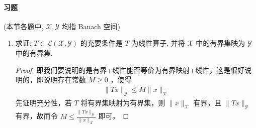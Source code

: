 \paragraph{习题} (本节各题中, $\mathscr{X}, \mathscr{Y}$ 均指 Banach 空间)
\begin{enumerate}[leftmargin=2cm, label=\arabic*]
    \item 求证: $T \in \mathscr{L}(\mathscr{X}, \mathscr{Y})$ 的充要条件是 $T$ 为线性算子, 并将 $\mathscr{X}$ 中的有界集映为 $\mathscr{Y}$ 中的有界集.
\begin{proof}
    即我们要说明的是有界+线性能否等价为有界映射+线性，这是很好说明的，即说明存在常数 $M\geqslant 0$ ，使得
\begin{align*}
    \|Tx\|_{\mathscr{Y}}\leqslant M\|x\|_{\mathscr{X}}
\end{align*}
先证明充分性，若 $T$ 将有界集映射为有界集，则 $\|x\|_{\mathscr{X}}$ 有界，且 $\|Tx\|_{\mathscr{Y}}$ 有界，故而令 $M\leqslant \frac{\|Tx\|_{\mathscr{Y}}}{\|x\|_{\mathscr{X}}}$ 即可。


\end{proof}
\end{enumerate}
